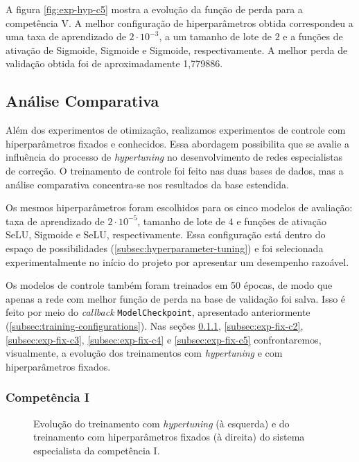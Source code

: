 A figura \ref{fig:exp-hyp-c5} mostra a evolução da função de perda para a competência V. A melhor configuração de hiperparâmetros obtida correspondeu a uma taxa de aprendizado de $2 \cdot 10^{-3}$, a um tamanho de lote de $2$ e a funções de ativação de Sigmoide, Sigmoide e Sigmoide, respectivamente. A melhor perda de validação obtida foi de aproximadamente 1,779886.

\subsection{Análise Comparativa}

Além dos experimentos de otimização, realizamos experimentos de controle com hiperparâmetros fixados e conhecidos. Essa abordagem possibilita que se avalie a influência do processo de \textit{hypertuning} no desenvolvimento de redes especialistas de correção. O treinamento de controle foi feito nas duas bases de dados, mas a análise comparativa concentra-se nos resultados da base estendida.

Os mesmos hiperparâmetros foram escolhidos para os cinco modelos de avaliação: taxa de aprendizado de $2 \cdot 10^{-5}$, tamanho de lote de $4$ e funções de ativação SeLU, Sigmoide e SeLU, respectivamente. Essa configuração está dentro do espaço de possibilidades (\autoref{subsec:hyperparameter-tuning}) e foi selecionada experimentalmente no início do projeto por apresentar um desempenho razoável.

Os modelos de controle também foram treinados em 50 épocas, de modo que apenas a rede com melhor função de perda na base de validação foi salva. Isso é feito por meio do \textit{callback} \texttt{ModelCheckpoint}, apresentado anteriormente (\autoref{subsec:training-configurations}). Nas seções \ref{subsec:exp-fix-c1}, \ref{subsec:exp-fix-c2}, \ref{subsec:exp-fix-c3}, \ref{subsec:exp-fix-c4} e \ref{subsec:exp-fix-c5} confrontaremos, visualmente, a evolução dos treinamentos com \textit{hypertuning} e com hiperparâmetros fixados.

\subsubsection{Competência I}
\label{subsec:exp-fix-c1}

\begin{figure}[H]
    \begin{minipage}{0.45\textwidth}
        \resizebox{\textwidth}{!}{}
    \end{minipage}
    \begin{minipage}{0.45\textwidth}
        \resizebox{\textwidth}{!}{}
    \end{minipage}

    \caption{Evolução do treinamento com \textit{hypertuning} (à esquerda) e do treinamento com hiperparâmetros fixados (à direita) do sistema especialista da competência I.}
    \label{fig:exp-fix-c1}
\end{figure}

